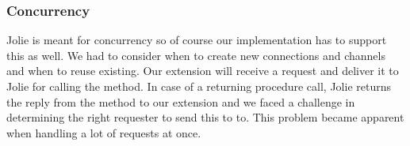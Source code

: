 \subsubsection{Concurrency}
Jolie is meant for concurrency so of course our implementation has to support this as well. We had to consider when to create new connections and channels and when to reuse existing. Our extension will receive a request and deliver it to Jolie for calling the method. In case of a returning procedure call, Jolie returns the reply from the method to our extension and we faced a challenge in determining the right requester to send this to to. This problem became apparent when handling a lot of requests at once.
\newpage
